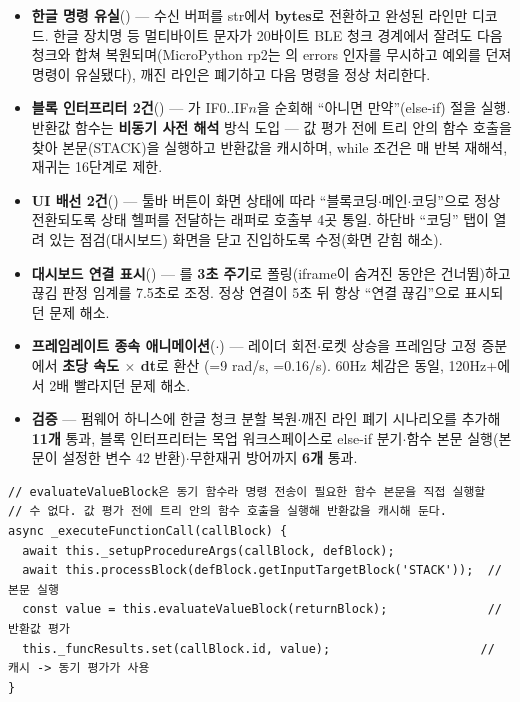 \begin{itemize}
  \item \textbf{한글 명령 유실}() — 수신 버퍼를 str에서 \textbf{bytes}로
  전환하고 완성된 라인만 디코드. 한글 장치명 등 멀티바이트 문자가 20바이트 BLE 청크 경계에서
  잘려도 다음 청크와 합쳐 복원되며(MicroPython rp2는 의 errors 인자를 무시하고
  예외를 던져 명령이 유실됐다), 깨진 라인은 폐기하고 다음 명령을 정상 처리한다.
  \item \textbf{블록 인터프리터 2건}() — 가
  IF0..IF$n$을 순회해 ``아니면 만약''(else-if) 절을 실행. 반환값 함수는 \textbf{비동기 사전
  해석} 방식 도입 --- 값 평가 전에 트리 안의 함수 호출을 찾아 본문(STACK)을 실행하고 반환값을
  캐시하며, while 조건은 매 반복 재해석, 재귀는 16단계로 제한.
  \item \textbf{UI 배선 2건}() — 툴바 버튼이 화면 상태에 따라
  ``블록코딩$\cdot$메인$\cdot$코딩''으로 정상 전환되도록 상태 헬퍼를 전달하는 래퍼로 호출부 4곳
  통일. 하단바 ``코딩'' 탭이 열려 있는 점검(대시보드) 화면을 닫고 진입하도록 수정(화면 갇힘 해소).
  \item \textbf{대시보드 연결 표시}() — 를 \textbf{3초
  주기}로 폴링(iframe이 숨겨진 동안은 건너뜀)하고 끊김 판정 임계를 7.5초로 조정. 정상 연결이
  5초 뒤 항상 ``연결 끊김''으로 표시되던 문제 해소.
  \item \textbf{프레임레이트 종속 애니메이션}($\cdot$) —
  레이더 회전$\cdot$로켓 상승을 프레임당 고정 증분에서 \textbf{초당 속도 $\times$ dt}로 환산
  (=9 rad/s, =0.16/s). 60Hz 체감은 동일, 120Hz+에서
  2배 빨라지던 문제 해소.
  \item \textbf{검증} — 펌웨어 하니스에 한글 청크 분할 복원$\cdot$깨진 라인 폐기 시나리오를
  추가해 \textbf{11개} 통과, 블록 인터프리터는 목업 워크스페이스로 else-if 분기$\cdot$함수
  본문 실행(본문이 설정한 변수 42 반환)$\cdot$무한재귀 방어까지 \textbf{6개} 통과.
\end{itemize}

\begin{verbatim}
// evaluateValueBlock은 동기 함수라 명령 전송이 필요한 함수 본문을 직접 실행할
// 수 없다. 값 평가 전에 트리 안의 함수 호출을 실행해 반환값을 캐시해 둔다.
async _executeFunctionCall(callBlock) {
  await this._setupProcedureArgs(callBlock, defBlock);
  await this.processBlock(defBlock.getInputTargetBlock('STACK'));  // 본문 실행
  const value = this.evaluateValueBlock(returnBlock);              // 반환값 평가
  this._funcResults.set(callBlock.id, value);                     // 캐시 -> 동기 평가가 사용
}
\end{verbatim}

